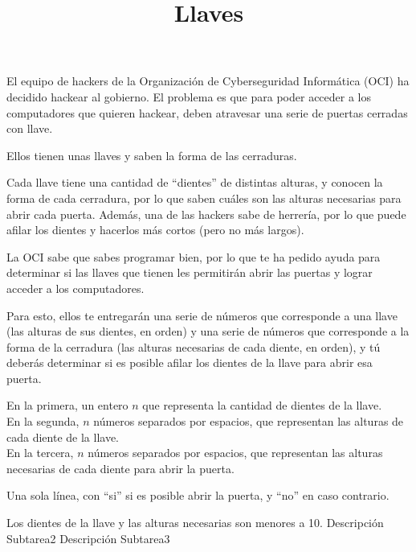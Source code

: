 \documentclass{oci}
\title{Llaves}
\begin{document}
\begin{problemDescription}
El equipo de hackers de la Organización de Cyberseguridad Informática (OCI) ha decidido hackear al gobierno. El problema es que para poder acceder a los computadores que quieren hackear, deben atravesar una serie de puertas cerradas con llave.

Ellos tienen unas llaves y saben la forma de las cerraduras.

Cada llave tiene una cantidad de ``dientes'' de distintas alturas, y conocen la forma de cada cerradura, por lo que saben cuáles son las alturas necesarias para abrir cada puerta. Además, una de las hackers sabe de herrería, por lo que puede afilar los dientes y hacerlos más cortos (pero no más largos).

La OCI sabe que sabes programar bien, por lo que te ha pedido ayuda para determinar si las llaves que tienen les permitirán abrir las puertas y lograr acceder a los computadores.

Para esto, ellos te entregarán una serie de números que corresponde a una llave (las alturas de sus dientes, en orden) y una serie de números que corresponde a la forma de la cerradura (las alturas necesarias de cada diente, en orden), y tú deberás determinar si es posible afilar los dientes de la llave para abrir esa puerta.
\end{problemDescription}

\begin{inputDescription}
En la primera, un entero $n$ que representa la cantidad de dientes de la llave.\\
En la segunda, $n$ números separados por espacios, que representan las alturas de cada diente de la llave.\\
En la tercera, $n$ números separados por espacios, que representan las alturas necesarias de cada diente para abrir la puerta.\\
\end{inputDescription}

\begin{outputDescription}
Una sola línea, con ``si'' si es posible abrir la puerta, y ``no'' en caso contrario.
\end{outputDescription}

\begin{scoreDescription}
  Los dientes de la llave y las alturas necesarias son menores a 10.
  Descripción Subtarea2
  Descripción Subtarea3
\end{scoreDescription}

\begin{sampleDescription}
\end{sampleDescription}
\end{document}
